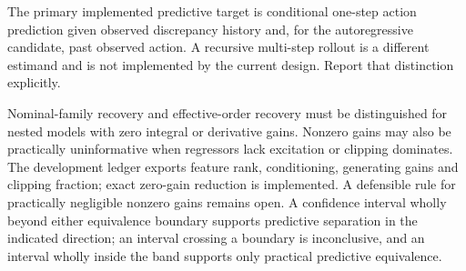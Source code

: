 The primary implemented predictive target is conditional one-step action prediction given observed discrepancy history and, for the autoregressive candidate, past observed action. A recursive multi-step rollout is a different estimand and is not implemented by the current design. Report that distinction explicitly.

Nominal-family recovery and effective-order recovery must be distinguished for nested models with zero integral or derivative gains. Nonzero gains may also be practically uninformative when regressors lack excitation or clipping dominates. The development ledger exports feature rank, conditioning, generating gains and clipping fraction; exact zero-gain reduction is implemented. A defensible rule for practically negligible nonzero gains remains open. A confidence interval wholly beyond either equivalence boundary supports predictive separation in the indicated direction; an interval crossing a boundary is inconclusive, and an interval wholly inside the band supports only practical predictive equivalence.

